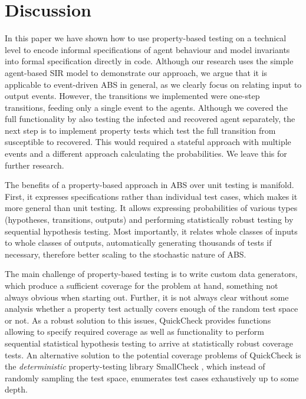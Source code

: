 \section{Discussion}
\label{sec:discussion}
In this paper we have shown how to use property-based testing on a technical level to encode informal specifications of agent behaviour and model invariants into formal specification directly in code. Although our research uses the simple agent-based SIR model to demonstrate our approach, we argue that it is applicable to event-driven ABS \cite{meyer_event-driven_2014} in general, as we clearly focus on relating input to output events. However, the transitions we implemented were one-step transitions, feeding only a single event to the agents. Although we covered the full functionality by also testing the infected and recovered agent separately, the next step is to implement property tests which test the full transition from susceptible to recovered. This would required a stateful approach with multiple events and a different approach calculating the probabilities. We leave this for further research.

The benefits of a property-based approach in ABS over unit testing is manifold. First, it expresses specifications rather than individual test cases, which makes it more general than unit testing. It allows expressing probabilities of various types (hypotheses, transitions, outputs) and performing statistically robust testing by sequential hypothesis testing. Most importantly, it relates whole classes of inputs to whole classes of outputs, automatically generating thousands of tests if necessary, therefore better scaling to the stochastic nature of ABS.

The main challenge of property-based testing is to write custom data generators, which produce a sufficient coverage for the problem at hand, something not always obvious when starting out. Further, it is not always clear without some analysis whether a property test actually covers enough of the random test space or not. As a robust solution to this issues, QuickCheck provides functions allowing to specify required coverage as well as functionality to perform sequential statistical hypothesis testing to arrive at statistically robust coverage tests. An alternative solution to the potential coverage problems of QuickCheck is the \textit{deterministic} property-testing library SmallCheck \cite{runciman_smallcheck_2008}, which instead of randomly sampling the test space, enumerates test cases exhaustively up to some depth.

